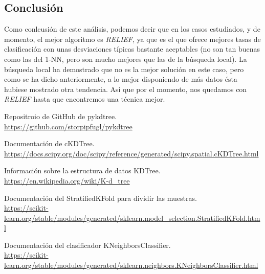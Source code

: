 \documentclass[11pt,a4paper]{article}
\begin{document}
\subsection{Conclusión}

Como conlcusión de este análisis, podemos decir que en los casos estudiados, y de momento, el mejor algoritmo es
\textit{RELIEF}, ya que es el que ofrece mejores tasas de clasificación con unas desviaciones típicas bastante aceptables
(no son tan buenas como las del 1-NN, pero son mucho mejores que las de la búsqueda local). La búsqueda local ha demostrado
que no es la mejor solución en este caso, pero como se ha dicho anteriormente, a lo mejor disponiendo de más datos ésta
hubiese mostrado otra tendencia. Asi que por el momento, nos quedamos con \textit{RELIEF} hasta que encontremos una técnica
mejor.

\newpage

\begin{thebibliography}{5}

Repositroio de GitHub de pykdtree.
\\\url{https://github.com/storpipfugl/pykdtree}

Documentación de cKDTree.
\\\url{https://docs.scipy.org/doc/scipy/reference/generated/scipy.spatial.cKDTree.html}

Información sobre la estructura de datos KDTree.
\\\url{https://en.wikipedia.org/wiki/K-d_tree}

Documentación del StratifiedKFold para dividir las muestras.
\\\url{https://scikit-learn.org/stable/modules/generated/sklearn.model_selection.StratifiedKFold.html}

Documentación del clasificador KNeighborsClassifier.
\\\url{https://scikit-learn.org/stable/modules/generated/sklearn.neighbors.KNeighborsClassifier.html}

\end{thebibliography}
\end{document}
